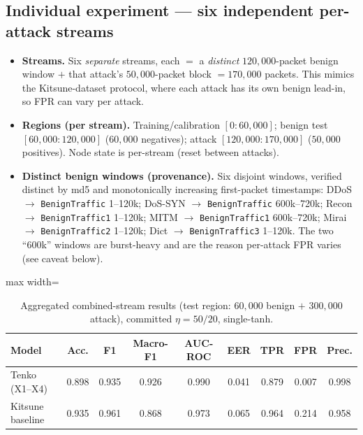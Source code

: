 \documentclass[10pt]{article}
\begin{document}
\subsection{Individual experiment --- six independent per-attack streams}
\begin{itemize}
\item \textbf{Streams.} Six \emph{separate} streams, each $=$ a \emph{distinct} $120{,}000$-packet
benign window $+$ that attack's $50{,}000$-packet block $=170{,}000$ packets. This mimics the
Kitsune-dataset protocol, where each attack has its own benign lead-in, so FPR can vary per
attack.
\item \textbf{Regions (per stream).} Training/calibration $[0{:}60{,}000]$; benign test
$[60{,}000{:}120{,}000]$ ($60{,}000$ negatives); attack $[120{,}000{:}170{,}000]$
($50{,}000$ positives). Node state is per-stream (reset between attacks).
\item \textbf{Distinct benign windows (provenance).} Six disjoint windows, verified distinct
by md5 and monotonically increasing first-packet timestamps: DDoS $\rightarrow$
\texttt{BenignTraffic} 1--120k; DoS-SYN $\rightarrow$ \texttt{BenignTraffic} 600k--720k;
Recon $\rightarrow$ \texttt{BenignTraffic1} 1--120k; MITM $\rightarrow$ \texttt{BenignTraffic1}
600k--720k; Mirai $\rightarrow$ \texttt{BenignTraffic2} 1--120k; Dict $\rightarrow$
\texttt{BenignTraffic3} 1--120k. The two ``600k'' windows are burst-heavy and are the reason
per-attack FPR varies (see caveat below).
\end{itemize}

\begin{table}[h]
\centering
\caption{Aggregated combined-stream results (test region: $60{,}000$ benign $+$
$300{,}000$ attack), committed $\eta{=}50/20$, single-tanh.}
\label{tab:agg}
\begin{adjustbox}{max width=\textwidth}
\begin{tabular}{l ccccc ccc}
\toprule
\textbf{Model} & \textbf{Acc.} & \textbf{F1} & \textbf{Macro-F1} & \textbf{AUC-ROC} & \textbf{EER} & \textbf{TPR} & \textbf{FPR} & \textbf{Prec.} \\
\midrule
Tenko (X1--X4)   & 0.898 & 0.935 & 0.926 & 0.990 & 0.041 & 0.879 & 0.007 & 0.998 \\
Kitsune baseline & 0.935 & 0.961 & 0.868 & 0.973 & 0.065 & 0.964 & 0.214 & 0.958 \\
\bottomrule
\end{tabular}
\end{adjustbox}
\end{table}
\end{document}
